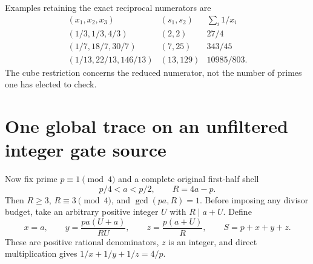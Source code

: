 Examples retaining the exact reciprocal numerators are
\[
 \begin{array}{c|c|c}
 (x_1,x_2,x_3)&(s_1,s_2)&\sum_i1/x_i\\\hline
 (1/3,1/3,4/3)&(2,2)&27/4\\
 (1/7,18/7,30/7)&(7,25)&343/45\\
 (1/13,22/13,146/13)&(13,129)&10985/803.
 \end{array}                                           \tag{TR6}
\]
The cube restriction concerns the reduced numerator, not the number of primes
one has elected to check.

\section{One global trace on an unfiltered integer gate source}
Now fix prime $p\equiv1\pmod4$ and a complete original first-half shell
\[
 p/4<a<p/2,\qquad R=4a-p.
\]
Then $R\ge3$, $R\equiv3\pmod4$, and $\gcd(pa,R)=1$.
Before imposing any divisor budget, take an arbitrary positive integer $U$ with
$R\mid a+U$. Define
\[
 \boxed{x=a,\qquad y=\frac{pa(U+a)}{RU},\qquad
 z=\frac{p(a+U)}R,\qquad S=p+x+y+z.}                    \tag{TR7}
\]
These are positive rational denominators, $z$ is an integer, and direct
multiplication gives $1/x+1/y+1/z=4/p$.

